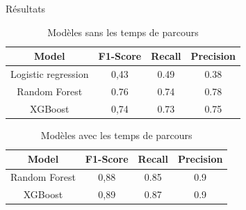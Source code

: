 \documentclass{beamer}
\begin{document}
\begin{frame}{Résultats}

\begin{table}[h]
  \centering
  \caption{Modèles sans les temps de parcours}
  \label{tab:Results}
  \begin{tabular}{|c|c|c|c|}
        \toprule
        \textbf{Model} & \textbf{F1-Score} & \textbf{Recall} & \textbf{Precision}  \\
        \midrule
        Logistic regression & 0,43 & 0.49 & 0.38  \\
        Random Forest & 0.76 & 0.74 & 0.78\\
        XGBoost & 0,74 & 0.73 & 0.75 \\
        \bottomrule
  \end{tabular}
\end{table}


\begin{table}[h]
  \centering
  \caption{Modèles avec les temps de parcours}
  \label{tab:Results}
  \begin{tabular}{|c|c|c|c|}
        \toprule
        \textbf{Model} & \textbf{F1-Score} & \textbf{Recall} & \textbf{Precision}  \\
        \midrule
        Random Forest & 0,88 & 0.85 & 0.9  \\
        XGBoost & 0,89 & 0.87 & 0.9  \\
        \bottomrule
  \end{tabular}
\end{table}
\end{frame}
\end{document}
